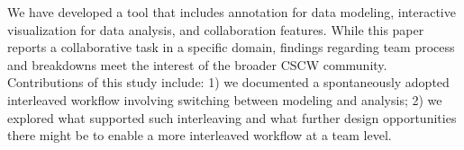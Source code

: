 We have developed a tool that includes annotation for data modeling, interactive
visualization for data analysis, and collaboration features. While this paper
reports a collaborative task in a specific domain, findings regarding team
process and breakdowns meet the interest of the broader CSCW community.
Contributions of this study include: 1) we documented a spontaneously adopted
interleaved workflow involving switching between modeling and analysis; 2) we
explored what supported such interleaving and what further design opportunities
there might be to enable a more interleaved workflow at a team level.

